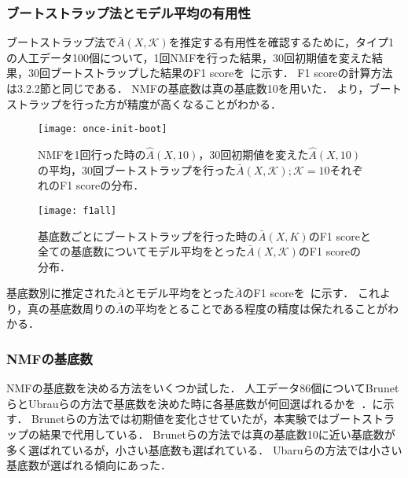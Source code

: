 \subsubsection{ブートストラップ法とモデル平均の有用性}
ブートストラップ法で$\bar{A}(X,\mathcal{K})$を推定する有用性を確認するために，タイプ1の人工データ100個について，1回NMFを行った結果，30回初期値を変えた結果，30回ブートストラップした結果のF1 scoreを~に示す．
F1 scoreの計算方法は3.2.2節と同じである．
NMFの基底数は真の基底数10を用いた．
より，ブートストラップを行った方が精度が高くなることがわかる．

\begin{figure}[htbp]
    \begin{minipage}{0.5\hsize}
			\begin{center}
					\texttt{[image: once-init-boot]}
					\caption{NMFを1回行った時の$\hat{A}(X,10)$，30回初期値を変えた$\hat{A}(X,10)$の平均，30回ブートストラップを行った$\bar{A}(X,\mathcal{K}); \mathcal{K} = {10}$それぞれのF1 scoreの分布．}
					\label{fig:once-init-boot}
			\end{center}
		\end{minipage}
    \begin{minipage}{0.5\hsize}
			\begin{center}
					\texttt{[image: f1all]}
					\caption{基底数ごとにブートストラップを行った時の$\bar{A}(X,{K})$のF1 scoreと全ての基底数についてモデル平均をとった$\bar{A}(X,\mathcal{K})$のF1 scoreの分布．}
					\label{fig:f1all}
			\end{center}
		\end{minipage}
\end{figure}

基底数別に推定された$\bar{A}$とモデル平均をとった$\bar{A}$のF1 scoreを~に示す．
これより，真の基底数周りの$\bar{A}$の平均をとることである程度の精度は保たれることがわかる．

\subsubsection{NMFの基底数}
NMFの基底数を決める方法をいくつか試した．
人工データ86個についてBrunetらとUbrauらの方法で基底数を決めた時に各基底数が何回選ばれるかを~．に示す．
Brunetらの方法では初期値を変化させていたが，本実験ではブートストラップの結果で代用している．
Brunetらの方法では真の基底数10に近い基底数が多く選ばれているが，小さい基底数も選ばれている．
Ubaruらの方法では小さい基底数が選ばれる傾向にあった．

